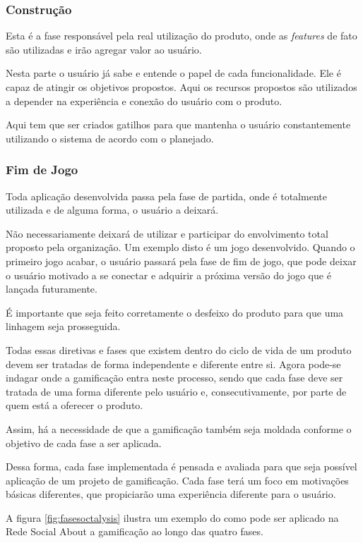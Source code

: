 \subsubsection{Construção}
\label{sub:constru_o}
Esta é a fase responsável pela real utilização do produto, onde as \textit{features}
de fato são utilizadas e irão agregar valor ao usuário.

Nesta parte o usuário já sabe e entende o papel de cada funcionalidade. Ele é capaz
de atingir os objetivos propostos. Aqui os recursos propostos são utilizados
a depender na experiência e conexão do usuário com o produto.

Aqui tem que ser criados gatilhos para que mantenha o usuário constantemente utilizando
o sistema de acordo com o planejado.

\subsubsection{Fim de Jogo}
\label{sub:fim_de_jogo}
Toda aplicação desenvolvida passa pela fase de partida, onde é totalmente utilizada
e de alguma forma, o usuário a deixará.

Não necessariamente deixará de utilizar e participar do envolvimento total proposto pela
organização. Um exemplo disto é um jogo desenvolvido. Quando o primeiro jogo acabar, o
usuário passará pela fase de fim de jogo, que pode deixar o usuário motivado a se conectar
e adquirir a próxima versão do jogo que é lançada futuramente.

É importante que seja feito corretamente o desfeixo do produto para que uma linhagem seja
prosseguida.


Todas essas diretivas e fases que existem dentro do ciclo de vida de um produto
devem ser
tratadas de forma independente e diferente entre si. Agora pode-se indagar onde
a gamificação
entra neste processo, sendo que cada fase deve ser tratada de uma forma diferente pelo
usuário e, consecutivamente, por parte de quem está a oferecer o produto.

Assim, há a necessidade de que a gamificação também seja moldada conforme o objetivo de
cada fase a ser aplicada.

Dessa forma, cada fase implementada é pensada e avaliada para que seja possível
aplicação de um  projeto de gamificação. Cada fase terá um foco em motivações
básicas diferentes, que propiciarão uma experiência diferente para o usuário.

A figura \ref{fig:fasesoctalysis} ilustra um exemplo do como pode ser aplicado na
Rede Social About a gamificação ao longo das quatro fases.

